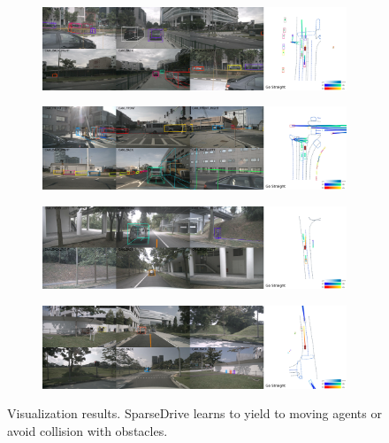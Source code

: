 \begin{figure}[htbp]
  \centering
  \begin{subfigure}{0.8\linewidth}
  \centering
  \includegraphics[width=1.0\linewidth]{Figures/vis/yield1.jpg}
  \end{subfigure}
  \begin{subfigure}{0.8\linewidth}
  \centering
  \includegraphics[width=1.0\linewidth]{Figures/vis/yield2.jpg}
  \end{subfigure}
  \begin{subfigure}{0.8\linewidth}
  \centering
  \includegraphics[width=1.0\linewidth]{Figures/vis/avoidance1.jpg}
  \end{subfigure}
  \begin{subfigure}{0.8\linewidth}
  \centering
  \includegraphics[width=1.0\linewidth]{Figures/vis/avoidance2.jpg}
  \end{subfigure}
  \caption{Visualization results. SparseDrive learns to yield to moving agents or avoid collision with obstacles.}
  \label{fig:vis}
\end{figure}